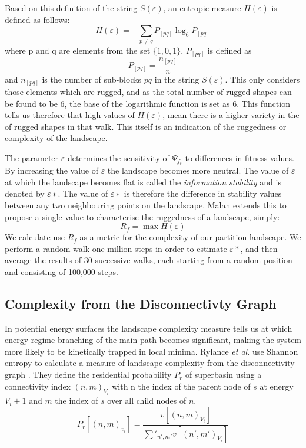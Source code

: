 Based on this definition of the string $S(\varepsilon)$, an entropic measure $H(\varepsilon)$ is defined as follows:
\[ 
H(\varepsilon) = - \sum_{p \neq q}P_{[pq]} \log_6 P_{[pq]}
\]
where p and q are elements from the set $\{1, 0, 1\}$, $P_{[pq]}$ is defined as
\[
P_{[pq]} = \frac{n_{[pq]}}{n}
 \]
and $n_{[pq]}$ is the number of sub-blocks $pq$ in the string $S(\varepsilon)$.  This only considers those elements which are rugged, and as the total number of rugged shapes can be found to be 6, the base of the logarithmic function is set as 6.  This function tells us therefore that high values of $H(\varepsilon)$, mean there is a higher variety in the of rugged shapes in that walk.  This itself is an indication of the ruggedness or complexity of the landscape.  

The parameter $\varepsilon$ determines the sensitivity of $\Psi_{f_t}$ to differences in fitness values. By increasing
the value of $\varepsilon$ the landscape becomes more neutral. The value of $\varepsilon$ at which the landscape becomes flat is called the \textit{information stability} and is denoted by $\varepsilon ∗$. The value of $\varepsilon ∗$ is therefore the difference in stability values between any two neighbouring points on the landscape.  
Malan extends this to propose a single value to characterise the ruggedness of a landscape, simply:
\[
R_f = \max{} H({\varepsilon})
\]
We calculate use $R_f$ as a metric for the complexity of our partition landscape.  We perform a random walk one million steps in order to estimate $\varepsilon *$, and then average the results of 30 successive walks, each starting from a random position and consisting of 100,000 steps.

\subsection{Complexity from the Disconnectivty Graph}
In potential energy surfaces the landscape complexity measure tells us at which energy regime branching of the main path becomes significant, making the system more likely to be kinetically trapped in local minima.  Rylance \textit{et al.} use Shannon entropy to calculate a measure of landscape complexity from the disconnectivity graph \cite{Rylance2006}.  They define the residential probability $P_r$ of superbasin using a connectivity index $(n,m)_{V_i}$ with n the index of the parent node of $s$ at energy $V_i+1$ and $m$ the index of $s$ over all child nodes of $n$.
\[ 
P_r [(n,m)_{v_i}]=\frac{v[(n,m)_{V_i}]}{\sum'_{n',m'}v[(n',m')_{V_i}]} 
\]

